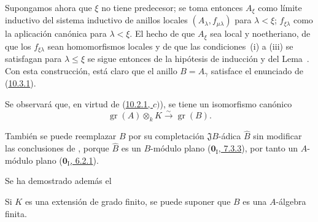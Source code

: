 \begin{env}[10.3.1.4]
Supongamos ahora que $\xi$ no tiene predecesor;
se toma entonces $A_\xi$ como límite inductivo del sistema inductivo de anillos locales $(A_\lambda,f_{\mu\lambda})$ para $\lambda<\xi$;
$f_{\xi\lambda}$ como la aplicación canónica para $\lambda<\xi$.
El hecho de que $A_\xi$ sea local y noetheriano, de que los $f_{\xi\lambda}$ sean homomorfismos locales y de que las condiciones~(i) a (iii) se satisfagan para $\lambda\leq\xi$
se sigue entonces de la hipótesis de inducción y del Lema~.
Con esta construcción, está claro que el anillo $B=A_\gamma$ satisface el enunciado de (\hyperref[0.10.3.1-fr]{10.3.1}).
\end{env}

Se observará que, en virtud de (\hyperref[0.10.2.1-fr]{10.2.1, $c)$}), se tiene un isomorfismo canónico
\[
\label{0.10.3.1.5-fr}
  \operatorname{gr}(A)\otimes_k K\xrightarrow{\sim}\operatorname{gr}(B).
  \tag{10.3.1.5}
\]

También se puede reemplazar $B$ por su completación $\mathfrak J B$-ádica $\widehat B$ sin modificar las conclusiones de , porque $\widehat B$ es un $B$-módulo plano (\hyperref[0.7.3.3-fr]{$\mathbf{0}_{\mathrm I}$, 7.3.3}), por tanto un $A$-módulo plano (\hyperref[0.6.2.1-fr]{$\mathbf{0}_{\mathrm I}$, 6.2.1}).

Se ha demostrado además el

\begin{corollary}[10.3.2]
\label{0.10.3.2}
\label{0.10.3.2-fr}
Si $K$ es una extensión de grado finito, se puede suponer que $B$ es una $A$-álgebra finita.
\end{corollary}
